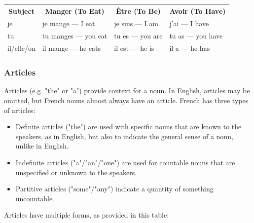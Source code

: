 \begin{tabular}{|l|l|l|l|}
\hline
\multicolumn{1}{|c|}{\textbf{Subject}} & \multicolumn{1}{c|}{\textbf{Manger (To Eat)}} & \multicolumn{1}{c|}{\textbf{Être (To Be)}} & \multicolumn{1}{c|}{\textbf{Avoir (To Have)}} \\ \hline
je                                     & je mange — I eat                              & je suis — I am                             & j'ai — I have                                 \\ \hline
tu                                     & tu manges — you eat                           & tu es — you are                            & tu as — you have                              \\ \hline
il/elle/on                             & il mange — he eats                            & il est — he is                             & il a — he has                                 \\ \hline
\end{tabular}


\pagebreak
\subsubsection{Articles}

Articles (e.g. "the" or "a") provide context for a noun. In English, articles may be omitted, but French nouns almost always have an article. French has three types of articles:

\begin{itemize}
  \item  Definite articles ("the") are used with specific nouns that are known to the speakers, as in English, but also to indicate the general sense of a noun, unlike in English.
  \item  Indefinite articles ("a"/"an"/"one") are used for countable nouns that are unspecified or unknown to the speakers.
  \item  Partitive articles ("some"/"any") indicate a quantity of something uncountable.
\end{itemize}
    
Articles have multiple forms, as provided in this table:

